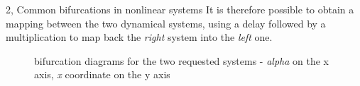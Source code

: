 \documentclass[10pt,a4paper]{article}
\begin{document}
\begin{task}{2, Common bifurcations in nonlinear systems}
It is therefore possible to obtain a mapping between the two dynamical systems, using a delay followed by a multiplication to map back the \textit{right} system into the \textit{left} one.


\begin{figure}[H]
    \centering
    \label{fig:task2_1}
    \hfill
    \label{fig:task2_2}
    \caption{bifurcation diagrams for the two requested systems - \textit{alpha} on the x axis, \textit{x} coordinate on the y axis}
    \label{fig:task2}
\end{figure}

\end{task}
\end{document}
